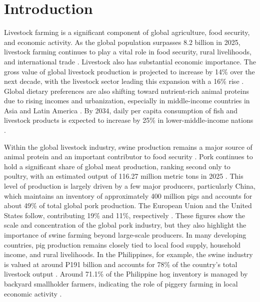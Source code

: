 \section{Introduction}

Livestock farming is a significant component of global agriculture, food security, and economic activity. As the global population surpasses 8.2 billion in 2025, livestock farming continues to play a vital role in food security, rural livelihoods, and international trade \cite{piyush2025animal,livestockproduction2026}. Livestock also has substantial economic importance. The gross value of global livestock production is projected to increase by 14\% over the next decade, with the livestock sector leading this expansion with a 16\% rise \cite{oecdfao2025outlook}. Global dietary preferences are also shifting toward nutrient-rich animal proteins due to rising incomes and urbanization, especially in middle-income countries in Asia and Latin America \cite{livestockproduction2026,oecdfao2025outlook}. By 2034, daily per capita consumption of fish and livestock products is expected to increase by 25\% in lower-middle-income nations \cite{oecdfao2025outlook,livestockproduction2026}.

Within the global livestock industry, swine production remains a major source of animal protein and an important contributor to food security \cite{livestockproduction2026}. Pork continues to hold a significant share of global meat production, ranking second only to poultry, with an estimated output of 116.27 million metric tons in 2025 \cite{usda2026pork}. This level of production is largely driven by a few major producers, particularly China, which maintains an inventory of approximately 400 million pigs and accounts for about 49\% of total global pork production. The European Union and the United States follow, contributing 19\% and 11\%, respectively \cite{usda2026pork}. These figures show the scale and concentration of the global pork industry, but they also highlight the importance of swine farming beyond large-scale producers. In many developing countries, pig production remains closely tied to local food supply, household income, and rural livelihoods. In the Philippines, for example, the swine industry is valued at around ₱191 billion and accounts for 78\% of the country's total livestock output \cite{livestockproduction2026,porcinews2026philippine,lo2025rebooting,villanueva2025philippine}. Around 71.1\% of the Philippine hog inventory is managed by backyard smallholder farmers, indicating the role of piggery farming in local economic activity \cite{lo2025rebooting}.

